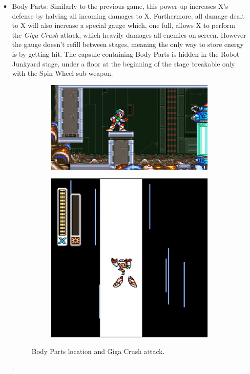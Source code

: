 \begin{itemize}
	\item Body Parts: Similarly to the previous game, this power-up increases X's defense by halving all incoming damages to X. Furthermore, all damage dealt to X will also increase a special gauge which, one full, allows X to perform the \textit{Giga Crush} attack, which heavily damages all enemies on screen. 
	However the gauge doesn't refill between stages, meaning the only way to store energy is by getting hit. The capsule containing Body Parts is hidden in the Robot Junkyard stage, under a floor at the beginning of the stage breakable only with the Spin Wheel sub-weapon.
	\begin{figure}[htp]
		\centering
		\begin{subfigure}{0.4\linewidth}
			\centering
			\includegraphics[width=\linewidth]{figures/X2/Morph_moth/Moth_capsule_2.jpg}
		\end{subfigure}
		\begin{subfigure}{0.4\linewidth}
			\centering
			\includegraphics[width=\linewidth]{figures/X2/weapons/G_crush_1.png}
		\end{subfigure}
		\caption{Body Parts location and Giga Crush attack.}
	\end{figure}.
	

\end{itemize}
